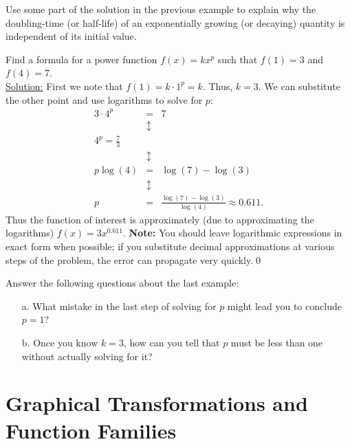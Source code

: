 \par

\begin{question} Use some part of the solution in the previous example to explain why the doubling-time (or half-life) of an exponentially growing (or decaying) quantity is independent of its initial value.
\end{question}

\par

\begin{eg} Find a formula for a power function $f(x) = kx^{p}$ such that $f(1) = 3$ and $f(4) = 7$.\\
\underline{Solution:} First we note that $f(1) = k\cdot 1^{p} = k$. Thus, $k=3$. We can substitute the other point and use logarithms to solve for $p$:
\begin{eqnarray*}
3\cdot 4^{p} & = & 7\\
& \updownarrow & \\
4^{p} = \frac{7}{3}\\
& \updownarrow & \\
p\log(4) & = & \log(7)-\log(3)\\
& \updownarrow & \\
p & = & \frac{\log(7)-\log(3)}{\log(4)}\approx 0.611.
\end{eqnarray*}
Thus the function of interest is approximately (due to approximating the logarithms) $f(x) = 3x^{0.611}$. {\bf Note:} You should leave logarithmic expressions in exact form when possible; if you substitute decimal approximations at various steps of the problem, the error can propagate very quickly.\qed \end{eg}

\pagebreak

\begin{question} Answer the following questions about the last example:
\begin{enumerate}
\item[a.] What mistake in the last step of solving for $p$ might lead you to conclude $p=1$?
\item[b.] Once you know $k=3$, how can you tell that $p$ must be less than one without actually solving for it? 
\end{enumerate}
\end{question}



\section{Graphical Transformations and Function Families}

